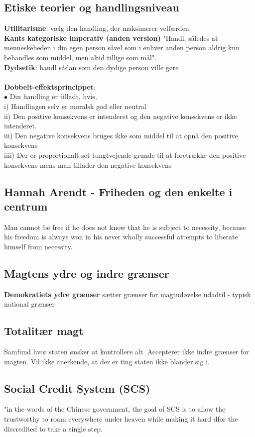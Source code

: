 \documentclass[11pt, fleqn]{article}
\begin{document}
	 \subsection*{Etiske teorier og handlingsniveau}
	 \vspace*{-0.2cm}
	 \textbf{Utilitarisme}: vælg den handling, der maksimerer velfærden \\
	 \textbf{Kants kategoriske imperativ (anden version)} "Handl, således at menneskeheden i din egen person såvel som i enhver anden person aldrig kun behandles som middel, men altid tillige som mål".
	 \\ \textbf{Dydsetik}: handl sådan som den dydige person ville gøre \\\\
	 \textbf{Dobbelt-effektsprincippet}: \\
	 $ \bullet $ Din handling er tilladt, hvis, \\
	 i) Handlingen selv er moralsk god eller neutral \\
	 ii) Den positive konsekvens er intenderet og den negative konsekvens er ikke intenderet. \\
	 iii) Den negative konsekvens bruges ikke som middel til at opnå den positive konsekvens \\
	 iiii) Der er proportionalt set tungtvejende grunde til at foretrække den positive konsekvens mens man tillader den negative konsekvens
	
	 \subsection*{Hannah Arendt - Friheden og den enkelte i centrum}
	\vspace*{-0.2cm}
	Man cannot be free if he does not know that he is subject to necessity, because his freedom is always won in his never wholly successful attempts to liberate himself from necessity.
	
	
	\subsection*{Magtens ydre og indre grænser}
	\vspace*{-0.2cm}
	\textbf{Demokratiets ydre grænser} sætter grænser for magtudøvelse udadtil - typisk national grænser
	
	\subsection*{Totalitær magt}
	\vspace*{-0.2cm}
	Samfund hvor staten ønsker at kontrollere alt. Accepterer ikke indre grænser for magten. Vil ikke anerkende, at der er ting staten ikke blander sig i. 
	
	\subsection*{Social Credit System (SCS)}
	\vspace*{-0.2cm}
	"in the words of the Chinese government, the goal of SCS is to allow the trustworthy to roam everywhere under heaven while making it hard dfor the discredited to take a single step.
	
\end{document}
